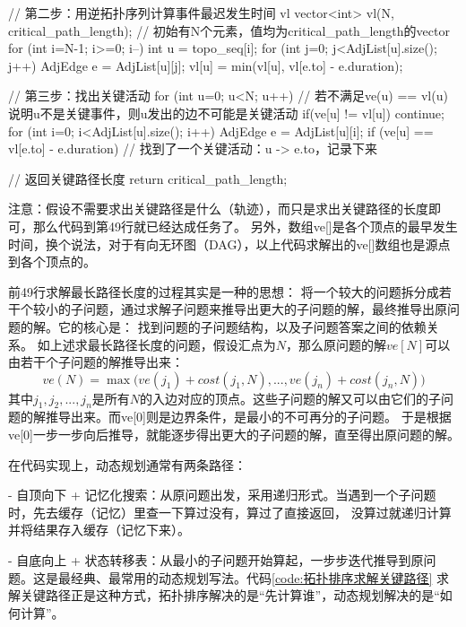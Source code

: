\begin{cppcodeNum}[codetitle={拓扑排序求解关键路径}, label={code:拓扑排序求解关键路径}]
{        // 第二步：用逆拓扑序列计算事件最迟发生时间 vl
        vector<int> vl(N, critical_path_length);    // 初始有N个元素，值均为critical_path_length的vector
        for (int i=N-1; i>=0; i--) {
            int u = topo_seq[i];
            for (int j=0; j<AdjList[u].size(); j++) {
                AdjEdge e = AdjList[u][j];
                vl[u] = min(vl[u], vl[e.to] - e.duration);
            }
        }

        // 第三步：找出关键活动
        for (int u=0; u<N; u++) {
            // 若不满足ve(u) == vl(u)说明u不是关键事件，则u发出的边不可能是关键活动
            if(ve[u] != vl[u]) {
                continue;
            }
            for (int i=0; i<AdjList[u].size(); i++) {
                AdjEdge e = AdjList[u][i];
                if (ve[u] == vl[e.to] - e.duration) {
                    // 找到了一个关键活动：u -> e.to，记录下来
                }
            }
        }

        // 返回关键路径长度
        return critical_path_length;
    }
\end{cppcodeNum}
注意：假设不需要求出关键路径是什么（轨迹），而只是求出关键路径的长度即可，那么代码到第49行就已经达成任务了。
另外，数组ve[]是各个顶点的最早发生时间，换个说法，对于有向无环图（DAG），以上代码求解出的ve[]数组也是源点到各个顶点的。

\begin{insightbox}
    \hspace{1.5em}前49行求解最长路径长度的过程其实是一种的思想：
    将一个较大的问题拆分成若干个较小的子问题，通过求解子问题来推导出更大的子问题的解，最终推导出原问题的解。它的核心是：
    找到问题的子问题结构，以及子问题答案之间的依赖关系。
    如上述求最长路径长度的问题，假设汇点为$N$，那么原问题的解$ve[N]$可以由若干个子问题的解推导出来：
    \[
        ve(N) = \max \bigl( ve(j_1) + cost(j_1, N), ..., ve(j_n) + cost(j_n, N) \bigr)
    \]
    其中$j_1, j_2, ..., j_n$是所有$N$的入边对应的顶点。这些子问题的解又可以由它们的子问题的解推导出来。而ve[0]则是边界条件，是最小的不可再分的子问题。
    于是根据ve[0]一步一步向后推导，就能逐步得出更大的子问题的解，直至得出原问题的解。

    \hspace{1.5em}在代码实现上，动态规划通常有两条路径：

    \hspace{1.5em}- 自顶向下 + 记忆化搜索：从原问题出发，采用递归形式。当遇到一个子问题时，先去缓存（记忆）里查一下算过没有，算过了直接返回，
    没算过就递归计算并将结果存入缓存（记忆下来）。

    \hspace{1.5em}- 自底向上 + 状态转移表：从最小的子问题开始算起，一步步迭代推导到原问题。这是最经典、最常用的动态规划写法。代码\ref{code:拓扑排序求解关键路径}
    求解关键路径正是这种方式，拓扑排序解决的是“先计算谁”，动态规划解决的是“如何计算”。
\end{insightbox}

